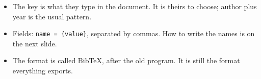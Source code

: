 \begin{frame}[fragile]
{\begin{itemize}
                The handout has the common ones and the fields each one needs.
            \item The key is what they type in the document.
                It is theirs to choose; author plus year is the usual pattern.
            \item Fields: \texttt{name = \{value\}}, separated by commas.
                How to write the names is on the next slide.
            \item The format is called Bib\TeX{}, after the old program.
                It is still the format everything exports.
        \end{itemize}
    }
\end{frame}

